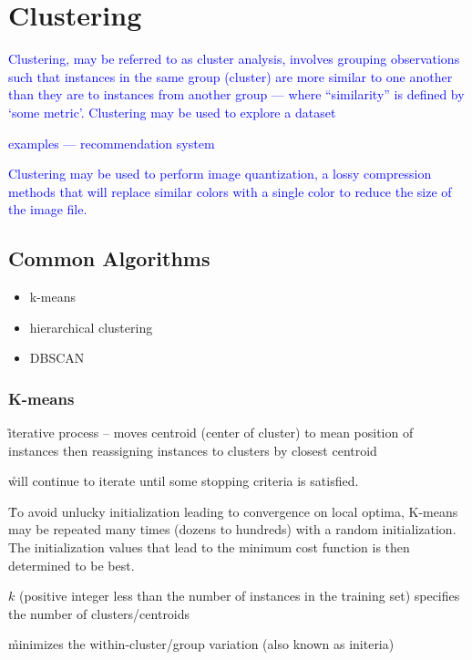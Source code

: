 \section{Clustering}

\textcolor{blue}{Clustering, may be referred to as cluster analysis, involves grouping observations such that instances in the same group (cluster) are more similar to one another than they are to instances from another group --- where ``similarity'' is defined by `some metric'. Clustering may be used to explore a dataset}

\textcolor{blue}{examples --- recommendation system}

\textcolor{blue}{Clustering may be used to perform {image quantization}, a lossy compression methods that will replace similar colors with a single color to reduce the size of the image file.}

\subsection{Common Algorithms}

\begin{itemize}[noitemsep,topsep=0pt]
	\item k-means
	\item hierarchical clustering
	\item DBSCAN
\end{itemize}

\subsubsection{K-means}

\r{iterative process -- moves centroid (center of cluster) to mean position of instances then reassigning instances to clusters by closest centroid}

\r{will continue to iterate until some stopping criteria is satisfied.}

\r{To avoid unlucky initialization leading to convergence on local optima, K-means may be repeated many times (dozens to hundreds) with a random initialization. The initialization values that lead to the minimum cost function is then determined to be best.}

\r{$k$ (positive integer less than the number of instances in the training set) specifies the number of clusters/centroids}

\r{minimizes the within-cluster/group variation (also known as initeria)}

